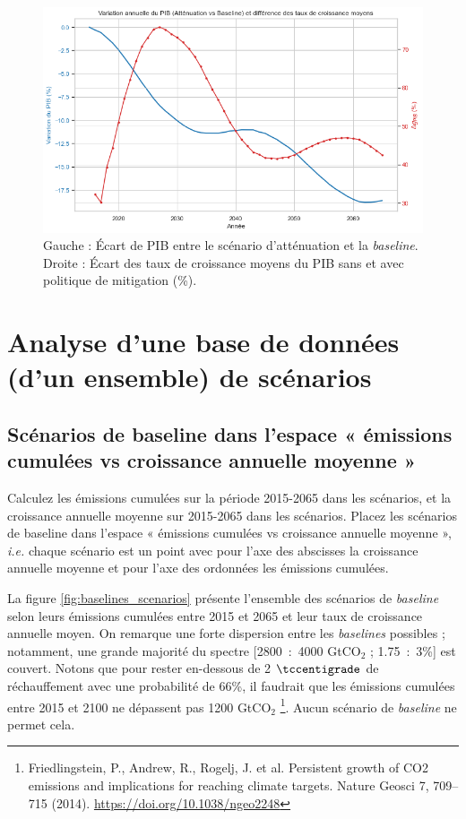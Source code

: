\documentclass[a4,11pt]{aleph-notas}
\newcommand{\ans}[1]{
\begin{mdframed}[
    roundcorner=10pt,     %
    backgroundcolor=gray!20, %
    linecolor=black,      %
    linewidth=1pt,        %
    innertopmargin=10pt,  %
    innerbottommargin=10pt, %
    innerleftmargin=10pt,  %
    innerrightmargin=10pt  %
]
#1
\end{mdframed}
}
\begin{document}
\begin{enumerate}
\end{enumerate}

\begin{figure}[H]
    \centering
    \includegraphics[width=\textwidth]{images_IMACLIM/variation_PIB.png}
    \caption{Gauche : Écart de PIB entre le scénario d'atténuation et la \textit{baseline}. Droite : Écart des taux de croissance moyens du PIB sans et avec politique de mitigation (\%).}
    \label{fig:variation_PIB}
\end{figure}

\vspace{0.3cm}
\section{{Analyse d’une base de données (d’un ensemble) de scénarios}}
\vspace{0.3cm}

\subsection{Scénarios de baseline dans l’espace « émissions cumulées vs croissance annuelle moyenne »}

\ans{Calculez les émissions cumulées sur la période 2015-2065 dans les scénarios, et la croissance annuelle moyenne sur 2015-2065 dans les scénarios. Placez les scénarios de baseline dans l’espace « émissions cumulées vs croissance annuelle moyenne », \textit{i.e.} chaque scénario est un point avec pour l’axe des abscisses la croissance annuelle moyenne et pour l’axe des ordonnées les émissions cumulées.}

La figure \ref{fig:baselines_scenarios} présente l'ensemble des scénarios de \textit{baseline} selon leurs émissions cumulées entre 2015 et 2065 et leur taux de croissance annuelle moyen. On remarque une forte dispersion entre les \textit{baselines} possibles ; notamment, une grande majorité du spectre [2800~:~4000 GtCO$_2$ ; 1.75~:~3\%] est couvert. Notons que pour rester en-dessous de 2 $\tccentigrade$ de réchauffement avec une probabilité de 66\%, il faudrait que les émissions cumulées entre 2015 et 2100 ne dépassent pas 1200 GtCO$_2$ \footnote{Friedlingstein, P., Andrew, R., Rogelj, J. et al. Persistent growth of CO2 emissions and implications for reaching climate targets. Nature Geosci 7, 709–715 (2014). \url{https://doi.org/10.1038/ngeo2248}}. Aucun scénario de \textit{baseline} ne permet cela.
\end{document}
